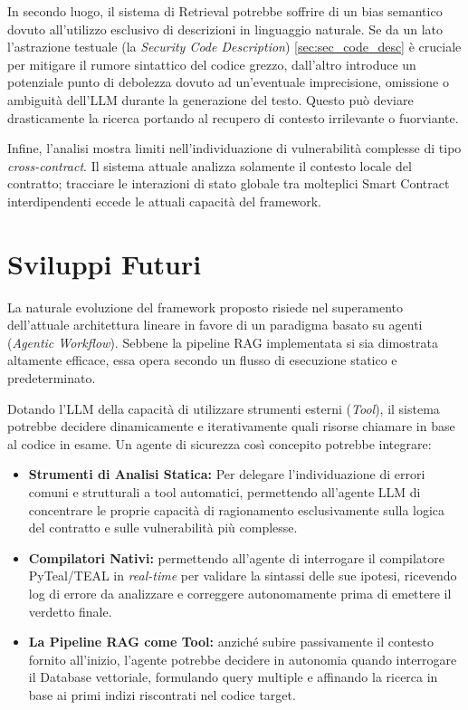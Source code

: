 In secondo luogo, il sistema di Retrieval potrebbe soffrire di un bias semantico dovuto all'utilizzo esclusivo di descrizioni in linguaggio naturale. Se da un lato l'astrazione testuale (la \textit{Security Code Description}) \ref{sec:sec_code_desc} è cruciale per mitigare il rumore sintattico del codice grezzo, dall'altro introduce un potenziale punto di debolezza dovuto ad un'eventuale imprecisione, omissione o ambiguità dell'LLM durante la generazione del testo. Questo può deviare drasticamente la ricerca portando al recupero di contesto irrilevante o fuorviante.

Infine, l'analisi mostra limiti nell'individuazione di vulnerabilità complesse di tipo \textit{cross-contract}. Il sistema attuale analizza solamente il contesto locale del contratto; tracciare le interazioni di stato globale tra molteplici Smart Contract interdipendenti eccede le attuali capacità del framework.

\section{Sviluppi Futuri}
La naturale evoluzione del framework proposto risiede nel superamento dell'attuale architettura lineare in favore di un paradigma basato su agenti (\textit{Agentic Workflow}). Sebbene la pipeline RAG implementata si sia dimostrata altamente efficace, essa opera secondo un flusso di esecuzione statico e predeterminato.

Dotando l'LLM della capacità di utilizzare strumenti esterni (\textit{Tool}), il sistema potrebbe decidere dinamicamente e iterativamente quali risorse chiamare in base al codice in esame. Un agente di sicurezza così concepito potrebbe integrare:
\begin{itemize}
    \item \textbf{Strumenti di Analisi Statica:} Per delegare l'individuazione di errori comuni e strutturali a tool automatici, permettendo all'agente LLM di concentrare le proprie capacità di ragionamento esclusivamente sulla logica del contratto e sulle vulnerabilità più complesse.
    \item \textbf{Compilatori Nativi:} permettendo all'agente di interrogare il compilatore PyTeal/TEAL in \textit{real-time} per validare la sintassi delle sue ipotesi, ricevendo log di errore da analizzare e correggere autonomamente prima di emettere il verdetto finale.
    \item \textbf{La Pipeline RAG come Tool:} anziché subire passivamente il contesto fornito all'inizio, l'agente potrebbe decidere in autonomia quando interrogare il Database vettoriale, formulando query multiple e affinando la ricerca in base ai primi indizi riscontrati nel codice target.
\end{itemize}

